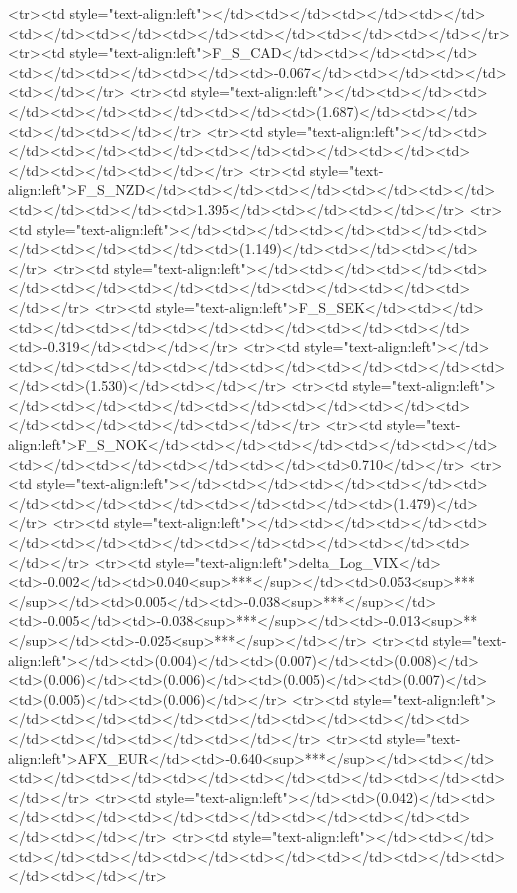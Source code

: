 <tr><td style="text-align:left"></td><td></td><td></td><td></td><td></td><td></td><td></td><td></td><td></td><td></td></tr>
<tr><td style="text-align:left">F_S_CAD</td><td></td><td></td><td></td><td></td><td></td><td>-0.067</td><td></td><td></td><td></td></tr>
<tr><td style="text-align:left"></td><td></td><td></td><td></td><td></td><td></td><td>(1.687)</td><td></td><td></td><td></td></tr>
<tr><td style="text-align:left"></td><td></td><td></td><td></td><td></td><td></td><td></td><td></td><td></td><td></td></tr>
<tr><td style="text-align:left">F_S_NZD</td><td></td><td></td><td></td><td></td><td></td><td></td><td>1.395</td><td></td><td></td></tr>
<tr><td style="text-align:left"></td><td></td><td></td><td></td><td></td><td></td><td></td><td>(1.149)</td><td></td><td></td></tr>
<tr><td style="text-align:left"></td><td></td><td></td><td></td><td></td><td></td><td></td><td></td><td></td><td></td></tr>
<tr><td style="text-align:left">F_S_SEK</td><td></td><td></td><td></td><td></td><td></td><td></td><td></td><td>-0.319</td><td></td></tr>
<tr><td style="text-align:left"></td><td></td><td></td><td></td><td></td><td></td><td></td><td></td><td>(1.530)</td><td></td></tr>
<tr><td style="text-align:left"></td><td></td><td></td><td></td><td></td><td></td><td></td><td></td><td></td><td></td></tr>
<tr><td style="text-align:left">F_S_NOK</td><td></td><td></td><td></td><td></td><td></td><td></td><td></td><td></td><td>0.710</td></tr>
<tr><td style="text-align:left"></td><td></td><td></td><td></td><td></td><td></td><td></td><td></td><td></td><td>(1.479)</td></tr>
<tr><td style="text-align:left"></td><td></td><td></td><td></td><td></td><td></td><td></td><td></td><td></td><td></td></tr>
<tr><td style="text-align:left">delta_Log_VIX</td><td>-0.002</td><td>0.040<sup>***</sup></td><td>0.053<sup>***</sup></td><td>0.005</td><td>-0.038<sup>***</sup></td><td>-0.005</td><td>-0.038<sup>***</sup></td><td>-0.013<sup>**</sup></td><td>-0.025<sup>***</sup></td></tr>
<tr><td style="text-align:left"></td><td>(0.004)</td><td>(0.007)</td><td>(0.008)</td><td>(0.006)</td><td>(0.006)</td><td>(0.005)</td><td>(0.007)</td><td>(0.005)</td><td>(0.006)</td></tr>
<tr><td style="text-align:left"></td><td></td><td></td><td></td><td></td><td></td><td></td><td></td><td></td><td></td></tr>
<tr><td style="text-align:left">AFX_EUR</td><td>-0.640<sup>***</sup></td><td></td><td></td><td></td><td></td><td></td><td></td><td></td><td></td></tr>
<tr><td style="text-align:left"></td><td>(0.042)</td><td></td><td></td><td></td><td></td><td></td><td></td><td></td><td></td></tr>
<tr><td style="text-align:left"></td><td></td><td></td><td></td><td></td><td></td><td></td><td></td><td></td><td></td></tr>
